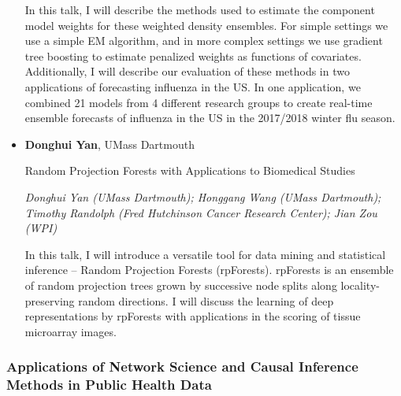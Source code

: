 \begin{itemize}
In this talk, I will describe the methods used to estimate the component model weights for these weighted density ensembles. For simple settings we use a simple EM algorithm, and in more complex settings we use gradient tree boosting to estimate penalized weights as functions of covariates. Additionally, I will describe our evaluation of these methods in two applications of forecasting influenza in the US. In one application, we combined 21 models from 4 different research groups to create real-time ensemble forecasts of influenza in the US in the 2017/2018 winter flu season.

\item \textbf{Donghui Yan}, UMass Dartmouth

Random Projection Forests with Applications to Biomedical Studies

\emph{\footnotesize Donghui Yan (UMass Dartmouth); Honggang Wang (UMass Dartmouth); Timothy Randolph (Fred Hutchinson Cancer Research Center); Jian Zou (WPI)}

In this talk, I will introduce a versatile tool for data mining and statistical inference -- Random Projection Forests (rpForests). rpForests is an ensemble of random projection trees grown by successive node splits along locality-preserving random directions. I will discuss the learning of deep representations by rpForests with applications in the scoring of tissue microarray images.

\end{itemize}

\subsubsection*{Applications of Network Science and Causal Inference Methods in Public Health Data}

